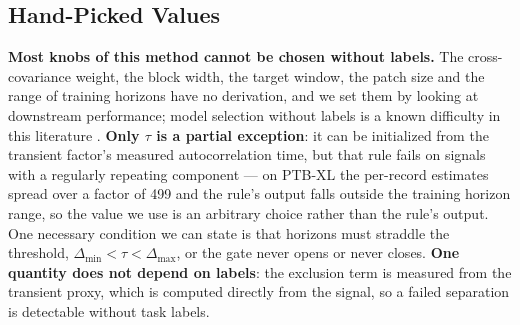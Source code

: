 \subsection{Hand-Picked Values}
\label{sec:handpicked}

\textbf{Most knobs of this method cannot be chosen without labels.} The cross-covariance weight, the block width, the target window, the patch size and the range of training horizons have no derivation, and we set them by looking at downstream performance; model selection without labels is a known difficulty in this literature \cite{locatello2019}. \textbf{Only $\tau$ is a partial exception}: it can be initialized from the transient factor's measured autocorrelation time, but that rule fails on signals with a regularly repeating component --- on PTB-XL the per-record estimates spread over a factor of 499 and the rule's output falls outside the training horizon range, so the value we use is an arbitrary choice rather than the rule's output. One necessary condition we can state is that horizons must straddle the threshold, $\Delta_{\min}<\tau<\Delta_{\max}$, or the gate never opens or never closes. \textbf{One quantity does not depend on labels}: the exclusion term is measured from the transient proxy, which is computed directly from the signal, so a failed separation is detectable without task labels.
